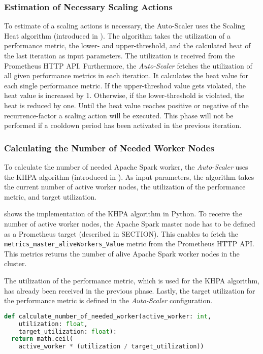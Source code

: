 \subsubsection{Estimation of Necessary Scaling Actions}
To estimate of a scaling actions is necessary, the Auto-Scaler uses the Scaling Heat algorithm (introduced in ).
The algorithm takes the utilization of a performance metric, the lower- and upper-threshold, and the calculated heat of the last iteration as input parameters.
The utilization is received from the Prometheus HTTP API. Furthermore, the \textit{Auto-Scaler} fetches the utilization of all given performance metrics in each iteration. It calculates the heat value for each single performance metric. If the upper-threshod value gets violated, the heat value is increased by 1. Otherwise, if the lower-threshold is violated, the heat is reduced by one.
Until the heat value reaches positive or negative of the recurrence-factor a scaling action will be executed.
This phase will not be performed if a cooldown period has been activated in the previous iteration.


\subsubsection{Calculating the Number of Needed Worker Nodes}
To calculate the number of needed Apache Spark worker, the \textit{Auto-Scaler} uses the KHPA algorithm (introduced in ).
As input parameters, the algorithm takes the current number of active worker nodes, the utilization of the performance metric, and target utilization.


 shows the implementation of the KHPA algorithm in Python.
To receive the number of active worker nodes, the Apache Spark master node has to be defined as a Prometheus target (described in SECTION). This enables to fetch the \texttt{metrics\_master\_aliveWorkers\_Value} metric from the Prometheus HTTP API. This metrics returns the number of alive Apache Spark worker nodes in the cluster.

The utilization of the performance metric, which is used for the KHPA algorithm, has already been received in the previous phase. Lastly, the target utilization for the performance metric is defined in the \textit{Auto-Scaler} configuration. 
\begin{lstlisting}[label=lst:06_auto-scaler_plan_khpa, caption=KHPA implementation using Python 3.8, language=Python]
def calculate_number_of_needed_worker(active_worker: int,
    utilization: float,
    target_utilization: float):
  return math.ceil(
    active_worker * (utilization / target_utilization))
\end{lstlisting}


